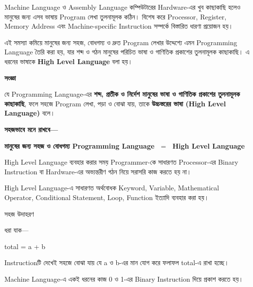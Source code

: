 
Machine Language ও Assembly Language কম্পিউটারের Hardware-এর খুব
কাছাকাছি হলেও মানুষের জন্য এসব ভাষায় Program লেখা তুলনামূলক কঠিন।
বিশেষ করে Processor, Register, Memory Address এবং Machine-specific
Instruction সম্পর্কে বিস্তারিত ধারণা প্রয়োজন হয়।

এই সমস্যা কমিয়ে মানুষের জন্য সহজ, বোধগম্য ও দ্রুত Program লেখার
উদ্দেশ্যে এমন Programming Language তৈরি করা হয়, যার শব্দ ও গঠন
মানুষের পরিচিত ভাষা ও গাণিতিক প্রকাশের তুলনামূলক কাছাকাছি।
এ ধরনের ভাষাকে \textbf{High Level Language} বলা হয়।


\begin{definitionbox}

\textbf{\color{darkTeal}সংজ্ঞা}

যে Programming Language-এর \textbf{শব্দ, প্রতীক ও নির্দেশ মানুষের
ভাষা ও গাণিতিক প্রকাশের তুলনামূলক কাছাকাছি}, ফলে সহজে Program
লেখা, পড়া ও বোঝা যায়, তাকে
\textbf{উচ্চস্তরের ভাষা (High Level Language)} বলে।

\end{definitionbox}

\textbf{সহজভাবে মনে রাখবে—}

\begin{center}

\textbf{
মানুষের জন্য সহজ ও বোধগম্য Programming Language
\(\;=\;\)
High Level Language
}

\end{center}

High Level Language ব্যবহার করার সময় Programmer-কে সাধারণত
Processor-এর Binary Instruction বা Hardware-এর অভ্যন্তরীণ গঠন
নিয়ে সরাসরি কাজ করতে হয় না।


High Level Language-এ সাধারণত অর্থবোধক Keyword, Variable,
Mathematical Operator, Conditional Statement, Loop, Function
ইত্যাদি ব্যবহার করা হয়।

\begin{examplebox}{সহজ উদাহরণ}

ধরা যাক—

\begin{center}

{\textenglish{\ttfamily total = a + b}}

\end{center}

Instructionটি দেখেই সহজে বোঝা যায় যে
\textenglish{\ttfamily a} ও \textenglish{\ttfamily b}-এর মান যোগ করে
ফলাফল \textenglish{\ttfamily total}-এ রাখা হচ্ছে।

Machine Language-এ একই ধরনের কাজ 0 ও 1-এর Binary Instruction
দিয়ে প্রকাশ করতে হয়।

\end{examplebox}


